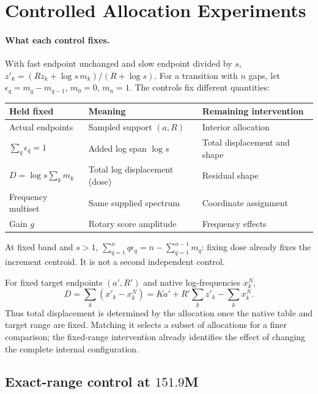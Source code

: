 \section{Controlled Allocation Experiments}
\label{sec:identification-details}

\paragraph{What each control fixes.}
With fast endpoint unchanged and slow endpoint divided by $s$,
$z'_k=(Rz_k+\log s\,m_k)/(R+\log s)$.
For a transition with $n$ gaps, let $\epsilon_q=m_q-m_{q-1}$, $m_0=0$, $m_n=1$. The controls fix different quantities:
\begin{center}\small
\begin{tabular}{@{}p{.26\linewidth}p{.32\linewidth}p{.34\linewidth}@{}}
\toprule
Held fixed & Meaning & Remaining intervention \\
\midrule
Actual endpoints & Sampled support $(a,R)$ & Interior allocation \\
$\sum_q\epsilon_q=1$ & Added log span $\log s$ & Total displacement and shape \\
$D=\log s\sum_k m_k$ & Total log displacement (dose) & Residual shape \\
Frequency multiset & Same supplied spectrum & Coordinate assignment \\
Gain $g$ & Rotary score amplitude & Frequency effects \\
\bottomrule
\end{tabular}
\end{center}
At fixed band and $s>1$, $\sum_{q=1}^n q\epsilon_q=n-\sum_{q=1}^{n-1}m_q$:
fixing dose already fixes the increment centroid. It is not a second independent control.

For fixed target endpoints $(a',R')$ and native log-frequencies $x_k^N$,
\[
D=\sum_k(x'_k-x_k^N)=Ka'+R'\sum_k z'_k-\sum_k x_k^N.
\]
Thus total displacement is determined by the allocation once the native table
and target range are fixed. Matching it selects a subset of allocations for
a finer comparison; the fixed-range intervention already identifies the effect
of changing the complete internal configuration.

\FloatBarrier
\subsection{Exact-range control at \texorpdfstring{$151.9$M}{151.9M}}
\label{sec:exact-range-control}

